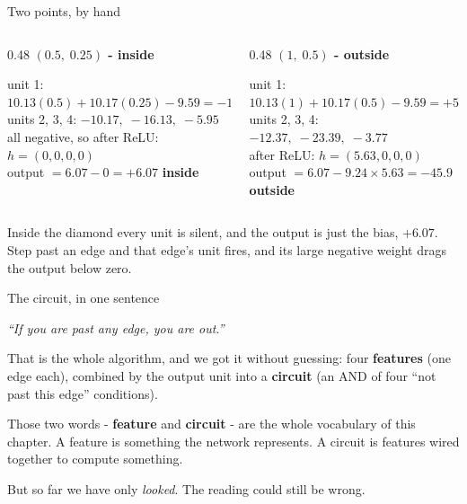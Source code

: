\documentclass[aspectratio=169]{beamer}
\newcommand{\keybox}[1]{%
  \begin{tcolorbox}[colback=armblue!8, colframe=armblue, boxrule=0.6pt, arc=2pt]
  #1
  \end{tcolorbox}}
\newcommand{\takebox}[1]{%
  \begin{tcolorbox}[colback=paramgreen!8, colframe=paramgreen, boxrule=0.6pt, arc=2pt]
  #1
  \end{tcolorbox}}
\begin{document}
\begin{frame}{Two points, by hand}
  \vspace{0.3em}
  \begin{columns}[T]
    \begin{column}{0.48\textwidth}
      \textbf{$(0.5,\; 0.25)$ - inside}

      \vspace{0.4em}
      {\small
      unit 1: $10.13(0.5) + 10.17(0.25) - 9.59 = -1.98$\\
      units 2, 3, 4: $-10.17,\; -16.13,\; -5.95$\\[0.4em]
      all negative, so after ReLU: $h = (0, 0, 0, 0)$\\[0.4em]
      output $= 6.07 - 0 = \mathbf{+6.07}$ \hfill \textcolor{paramgreen}{\textbf{inside}}}
    \end{column}
    \begin{column}{0.48\textwidth}
      \textbf{$(1,\; 0.5)$ - outside}

      \vspace{0.4em}
      {\small
      unit 1: $10.13(1) + 10.17(0.5) - 9.59 = +5.63$\\
      units 2, 3, 4: $-12.37,\; -23.39,\; -3.77$\\[0.4em]
      after ReLU: $h = (5.63, 0, 0, 0)$\\[0.4em]
      output $= 6.07 - 9.24 \times 5.63 = \mathbf{-45.9}$ \hfill
      \textcolor{armred}{\textbf{outside}}}
    \end{column}
  \end{columns}

  \vspace{1.0em}
  \keybox{Inside the diamond every unit is silent, and the output is just the bias, $+6.07$. Step
  past an edge and that edge's unit fires, and its large negative weight drags the output below
  zero.}
\end{frame}

\begin{frame}{The circuit, in one sentence}
  \vspace{1.0em}
  \begin{center}
    {\Large \emph{``If you are past any edge, you are out.''}}
  \end{center}

  \vspace{1.1em}
  That is the whole algorithm, and we got it without guessing: four \textbf{features} (one edge
  each), combined by the output unit into a \textbf{circuit} (an AND of four ``not past this
  edge'' conditions).

  \vspace{0.9em}
  \takebox{Those two words - \textbf{feature} and \textbf{circuit} - are the whole vocabulary of
  this chapter. A feature is something the network represents. A circuit is features wired
  together to compute something.}

  \vspace{0.6em}
  {\small But so far we have only \emph{looked}. The reading could still be wrong.}
\end{frame}
\end{document}
